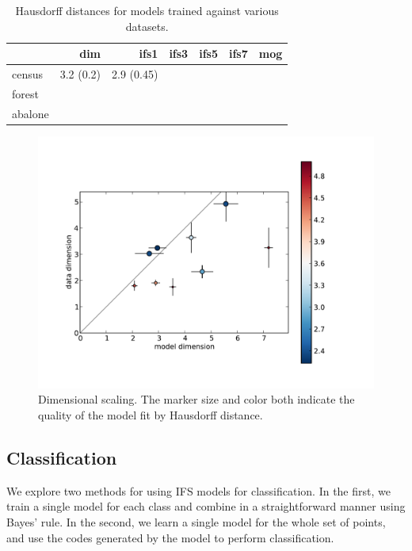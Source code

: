 \documentclass[10pt,a4paper,oneside]{article}
\theoremstyle{definition}
\begin{document}
\begin{table}
\begin{tabular}{l | r r r r r | r |}
\hline
  & dim & ifs1 & ifs3 & ifs5 & ifs7 & mog \\
\hline
census & 3.2 (0.2) & 2.9 (0.45) & & & & \\
forest & & & & & & \\
abalone & & & & & & \\
\hline

\end{tabular}
\caption{Hausdorff distances for models trained against various datasets.}
\label{tablelabel}
\end{table}

\begin{figure}[htb]
\centering
\includegraphics[width=\textwidth]{../img/out-table.pdf}
\caption{Dimensional scaling. The marker size and color both indicate the quality of the model fit by Hausdorff distance. }
\label{fig:dim_scale}
\end{figure}


\subsection*{Classification}

We explore two methods for using IFS models for classification. In the first, we train a single model for each class and combine in a straightforward manner using Bayes' rule. In the second, we learn a single model for the whole set of points, and use the codes generated by the model to perform classification.  
\end{document}
